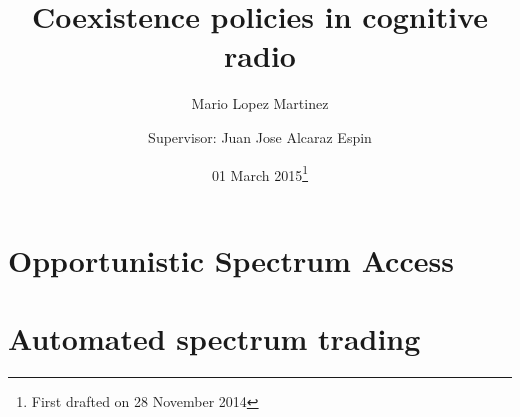 \documentclass[12pt,a4paper,twoside]{memoir}
\begin{document}
\title{Coexistence policies in cognitive radio}
\author{Mario Lopez Martinez \and
Supervisor: Juan Jose Alcaraz Espin}
\date{01 March 2015\thanks{First drafted on 28 November 2014}}

\frontmatter
\maketitle
%
\clearpage
\tableofcontents
\clearpage
\listoffigures
\clearpage
\listoftables
\clearpage


\mainmatter

\part{Opportunistic Spectrum Access}\label{part_OSA}






\part{Automated spectrum trading}\label{part_auto}





%
\backmatter
{}

%
%

\end{document}
